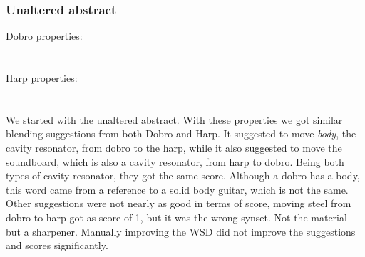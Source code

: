 %
%			
%			
%
\subsubsection{Unaltered abstract}

Dobro properties:\\
\noindent{}
\\\\Harp properties:\\
\noindent{}
\\\\We started with the unaltered abstract.
With these properties we got similar blending suggestions from both Dobro and Harp. It suggested to move \emph{body}, the cavity resonator, from dobro to the harp, while it also suggested to move the soundboard, which is also a cavity resonator, from harp to dobro. Being both types of cavity resonator, they got the same score. Although a dobro has a body, this word came from a reference to a solid body guitar, which is not the same. Other suggestions were not nearly as good in terms of score, moving steel from dobro to harp got as score of 1, but it was the wrong synset. Not the material but a sharpener. Manually improving the WSD did not improve the suggestions and scores significantly. 
		

